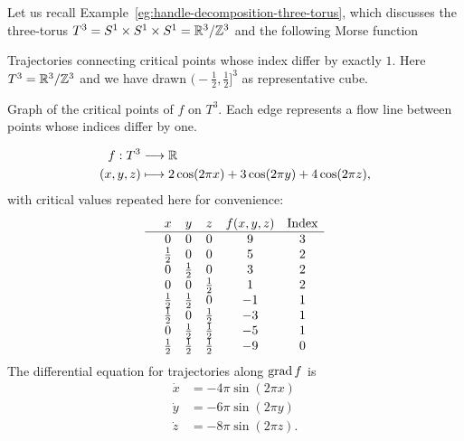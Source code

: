 \begin{eg}
    \label{eg:homology-of-the-three-torus}
    Let us recall Example~\ref{eg:handle-decomposition-three-torus}, which discusses the three-torus $T^{3} = S^{1} \times S^{1} \times S^{1} = \mathbb{R}^3 / \mathbb{Z}^3$ and the following Morse function
    \begin{marginfigure}
        \centering
        \caption{
        Trajectories connecting critical points whose index differ by exactly $1$.
        Here $T^{3} = \mathbb{R}^{3} / \mathbb{Z}^{3}$ and we have drawn $\big(-\frac{1}{2}, \frac{1}{2}\big]^3$ as representative cube.  }
        \label{fig:morse-homology-three-torus-trajectories}
    \end{marginfigure}
    \begin{marginfigure}
        \centering
        \caption{Graph of the critical points of $f$ on $T^{3}$.
            Each edge represents a flow line between points whose indices differ by one.
        }
        \label{fig:mores-homology-three-torus-critical-points-graph}
    \end{marginfigure}
    \begin{align*}
        f: T^3 &\longrightarrow \mathbb{R} \\
        (x,y,z) &\longmapsto 2 \cos(2 \pi x)+ 3 \cos(2 \pi y) + 4 \cos (2 \pi z),
    \end{align*}
    with critical values repeated here for convenience:
    \[\begin{array}{cccccc}
  & x & y  & z & f(x, y, z) & \text{Index}\\ \hline
  & 0 & 0 & 0 & 9 & 3 \\
& \frac{1}{2} & 0 & 0 & 5 & 2 \\
& 0 & \frac{1}{2} & 0 & 3 & 2 \\
& 0 & 0 & \frac{1}{2} & 1 & 2 \\
& \frac{1}{2} & \frac{1}{2} & 0 & -1 & 1 \\
& \frac{1}{2} & 0 & \frac{1}{2} & -3 & 1 \\
& 0 & \frac{1}{2} & \frac{1}{2} & -5 & 1 \\
& \frac{1}{2} & \frac{1}{2} & \frac{1}{2} & -9 & 0 \\
    \end{array}\]
    The differential equation for trajectories along $\operatorname{grad} f$ is 
    \begin{align*}
        \dot x &= -4 \pi \sin(2 \pi x)\\
        \dot y &= -6 \pi \sin(2 \pi y)\\
        \dot z &= -8 \pi \sin(2 \pi z)
    .\end{align*} 



\end{eg}
